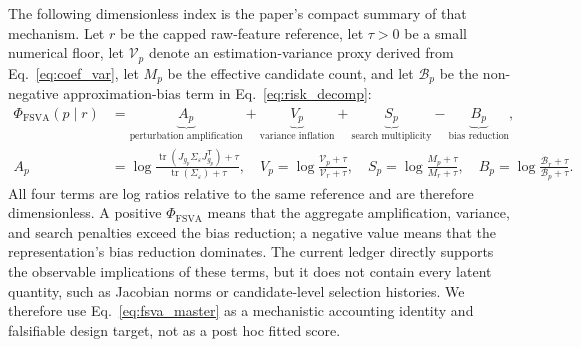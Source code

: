 \documentclass[preprint,12pt]{elsarticle}
\begin{document}
The following dimensionless index is the paper's compact summary of that mechanism.  Let $r$ be the capped raw-feature reference, let $\tau>0$ be a small numerical floor, let $\mathcal{V}_p$ denote an estimation-variance proxy derived from Eq.~\eqref{eq:coef_var}, let $M_p$ be the effective candidate count, and let $\mathcal{B}_p$ be the non-negative approximation-bias term in Eq.~\eqref{eq:risk_decomp}:
\begin{equation}
\boxed{\begin{aligned}
  \Phi_{\mathrm{FSVA}}(p\mid r)
  &=\underbrace{A_p}_{\text{perturbation amplification}}
   +\underbrace{V_p}_{\text{variance inflation}}
   +\underbrace{S_p}_{\text{search multiplicity}}
   -\underbrace{B_p}_{\text{bias reduction}},\\[-2pt]
  A_p&=\log\!\frac{\operatorname{tr}\!\left(J_{g_p}\Sigma_{\varepsilon}J_{g_p}^{\mathsf T}\right)+\tau}
                         {\operatorname{tr}(\Sigma_{\varepsilon})+\tau},\quad
  V_p=\log\!\frac{\mathcal{V}_p+\tau}{\mathcal{V}_r+\tau},\quad
  S_p=\log\!\frac{M_p+\tau}{M_r+\tau},\quad
  B_p=\log\!\frac{\mathcal{B}_r+\tau}{\mathcal{B}_p+\tau}.
\end{aligned}}
\label{eq:fsva_master}
\end{equation}
All four terms are log ratios relative to the same reference and are therefore dimensionless.  A positive $\Phi_{\mathrm{FSVA}}$ means that the aggregate amplification, variance, and search penalties exceed the bias reduction; a negative value means that the representation's bias reduction dominates.  The current ledger directly supports the observable implications of these terms, but it does not contain every latent quantity, such as Jacobian norms or candidate-level selection histories.  We therefore use Eq.~\eqref{eq:fsva_master} as a mechanistic accounting identity and falsifiable design target, not as a post hoc fitted score.
\end{document}
